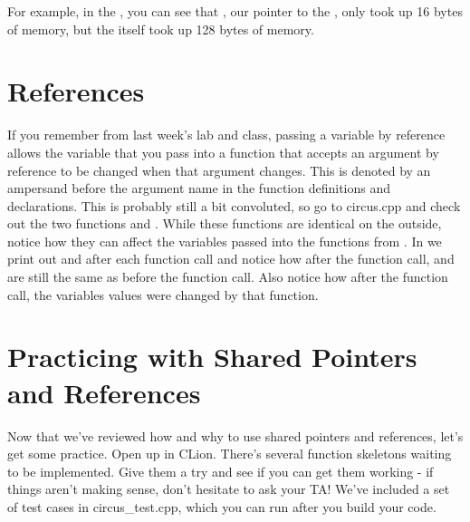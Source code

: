 \documentclass{tufte-handout}
\begin{document}
For example, in the , you can see that , our pointer to the , only took up 16 bytes of memory, but the  itself took up 128 bytes of memory.


\section{References}
If you remember from last week's lab and class, passing a variable by reference allows the variable that you pass into a function that accepts an argument by reference to be changed when that argument changes.
This is denoted by an ampersand before the argument name in the function definitions and declarations.
This is probably still a bit convoluted, so go to circus.cpp and check out the two functions  and .  
While these functions are identical on the outside, notice how they can affect the variables passed into the functions from . 
In  we print out  and  after each function call and notice how after the  function call,  and  are still the same as before the function call.
Also notice how after the  function call, the variables values were changed by that function.

\section{Practicing with Shared Pointers and References}
Now that we've reviewed how and why to use shared pointers and references, let's get some practice. Open up  in CLion. 
There's several function skeletons waiting to be implemented. 
Give them a try and see if you can get them working - if things aren't making sense, don't hesitate to ask your TA!
We've included a set of test cases in circus\_test.cpp, which you can run after you build your code. 
\end{document}
